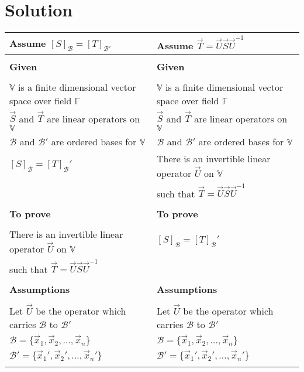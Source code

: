 \documentclass[journal,12pt,twocolumn]{IEEEtran}
\begin{document}
\section{Solution}
\begin{table*}[h!]
\begin{center}
\begin{tabular}{|l|l|}
\hline
Assume $[S]_\mathcal{B} = [T]_\mathcal{B'}$ & Assume $\vec{T} = \vec{U}\vec{S}\vec{U}^{-1}$\\[0.5ex]\hline
 & \\
\textbf{Given}&\textbf{Given}\\
 & \\
$\mathbb V$ is a finite dimensional vector space over field $\mathbb F$ & $\mathbb V$ is a finite dimensional vector space over field $\mathbb F$\\ $\vec{S}$ and $\vec{T}$ are linear operators on $\mathbb V$ & $\vec{S}$ and $\vec{T}$ are linear operators on $\mathbb V$\\
$\mathcal{B}$ and $\mathcal{B}'$ are ordered bases for $\mathbb V$ & $\mathcal{B}$ and $\mathcal{B}'$ are ordered bases for $\mathbb V$\\
$[S]_\mathcal{B} = [T]_\mathcal{B}'$ & There is an invertible linear operator $\vec{U}$ on $\mathbb V$\\
 &  such that $\vec{T} = \vec{U}\vec{S}\vec{U}^{-1}$\\ [0.5ex] \hline
  & \\
\textbf{To prove}&\textbf{To prove}\\
 & \\
There is an invertible linear operator $\vec{U}$ on $\mathbb V$ & $[S]_\mathcal{B} = [T]_\mathcal{B}'$\\
such that $\vec{T} = \vec{U}\vec{S}\vec{U}^{-1}$ & \\ [0.5ex] \hline
 & \\
\textbf{Assumptions}&\textbf{Assumptions}\\
 & \\
Let $\vec{U}$ be the operator which carries $\mathcal{B}$ to $\mathcal{B}'$ &
Let $\vec{U}$ be the operator which carries $\mathcal{B}$ to $\mathcal{B}'$\\
$\mathcal{B} = \{\vec{x}_1,\vec{x}_2,\ldots,\vec{x}_n\}$ &
$\mathcal{B} = \{\vec{x}_1,\vec{x}_2,\ldots,\vec{x}_n\}$\\
$\mathcal{B}' = \{\vec{x}_1',\vec{x}_2',\ldots,\vec{x}_n'\}$ &
$\mathcal{B}' = \{\vec{x}_1',\vec{x}_2',\ldots,\vec{x}_n'\}$\\ [0.5ex] \hline
 & \\

\end{tabular}
\end{center}
\end{table*}
\end{document}
